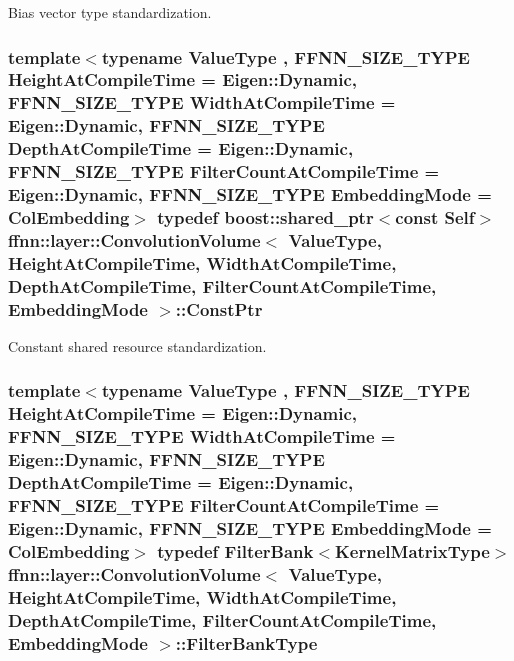 Bias vector type standardization. 

\hypertarget{classffnn_1_1layer_1_1_convolution_volume_ae43bab766fff2856d2ae2bbef73e6416}{
\subsubsection[{Const\-Ptr}]{\setlength{\rightskip}{0pt plus 5cm}template$<$typename Value\-Type , F\-F\-N\-N\-\_\-\-S\-I\-Z\-E\-\_\-\-T\-Y\-P\-E Height\-At\-Compile\-Time = Eigen\-::\-Dynamic, F\-F\-N\-N\-\_\-\-S\-I\-Z\-E\-\_\-\-T\-Y\-P\-E Width\-At\-Compile\-Time = Eigen\-::\-Dynamic, F\-F\-N\-N\-\_\-\-S\-I\-Z\-E\-\_\-\-T\-Y\-P\-E Depth\-At\-Compile\-Time = Eigen\-::\-Dynamic, F\-F\-N\-N\-\_\-\-S\-I\-Z\-E\-\_\-\-T\-Y\-P\-E Filter\-Count\-At\-Compile\-Time = Eigen\-::\-Dynamic, F\-F\-N\-N\-\_\-\-S\-I\-Z\-E\-\_\-\-T\-Y\-P\-E Embedding\-Mode = Col\-Embedding$>$ typedef boost\-::shared\-\_\-ptr$<$const {\bf Self}$>$ {\bf ffnn\-::layer\-::\-Convolution\-Volume}$<$ Value\-Type, Height\-At\-Compile\-Time, Width\-At\-Compile\-Time, Depth\-At\-Compile\-Time, Filter\-Count\-At\-Compile\-Time, {\bf Embedding\-Mode} $>$\-::{\bf Const\-Ptr}}}\label{classffnn_1_1layer_1_1_convolution_volume_ae43bab766fff2856d2ae2bbef73e6416}


Constant shared resource standardization. 

\hypertarget{classffnn_1_1layer_1_1_convolution_volume_a00ac018ac5cb79534a5b3b4fbc55637e}{
\subsubsection[{Filter\-Bank\-Type}]{\setlength{\rightskip}{0pt plus 5cm}template$<$typename Value\-Type , F\-F\-N\-N\-\_\-\-S\-I\-Z\-E\-\_\-\-T\-Y\-P\-E Height\-At\-Compile\-Time = Eigen\-::\-Dynamic, F\-F\-N\-N\-\_\-\-S\-I\-Z\-E\-\_\-\-T\-Y\-P\-E Width\-At\-Compile\-Time = Eigen\-::\-Dynamic, F\-F\-N\-N\-\_\-\-S\-I\-Z\-E\-\_\-\-T\-Y\-P\-E Depth\-At\-Compile\-Time = Eigen\-::\-Dynamic, F\-F\-N\-N\-\_\-\-S\-I\-Z\-E\-\_\-\-T\-Y\-P\-E Filter\-Count\-At\-Compile\-Time = Eigen\-::\-Dynamic, F\-F\-N\-N\-\_\-\-S\-I\-Z\-E\-\_\-\-T\-Y\-P\-E Embedding\-Mode = Col\-Embedding$>$ typedef {\bf Filter\-Bank}$<${\bf Kernel\-Matrix\-Type}$>$ {\bf ffnn\-::layer\-::\-Convolution\-Volume}$<$ Value\-Type, Height\-At\-Compile\-Time, Width\-At\-Compile\-Time, Depth\-At\-Compile\-Time, Filter\-Count\-At\-Compile\-Time, {\bf Embedding\-Mode} $>$\-::{\bf Filter\-Bank\-Type}}}\label{classffnn_1_1layer_1_1_convolution_volume_a00ac018ac5cb79534a5b3b4fbc55637e}



